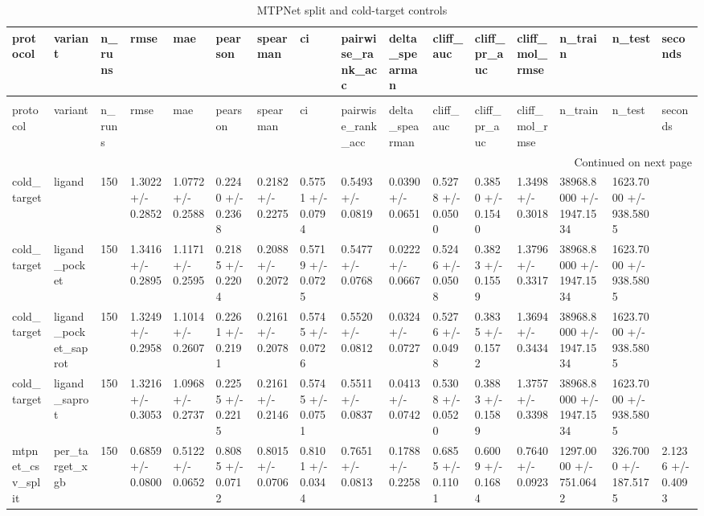 \begin{longtable}{llllllllllllllll}
\caption{MTPNet split and cold-target controls} \label{tab:table_09b_mtpnet_controls} \\
\toprule
protocol & variant & n\_runs & rmse & mae & pearson & spearman & ci & pairwise\_rank\_acc & delta\_spearman & cliff\_auc & cliff\_pr\_auc & cliff\_mol\_rmse & n\_train & n\_test & seconds \\
\midrule
\endfirsthead
\caption[]{MTPNet split and cold-target controls} \\
\toprule
protocol & variant & n\_runs & rmse & mae & pearson & spearman & ci & pairwise\_rank\_acc & delta\_spearman & cliff\_auc & cliff\_pr\_auc & cliff\_mol\_rmse & n\_train & n\_test & seconds \\
\midrule
\endhead
\midrule
\multicolumn{16}{r}{Continued on next page} \\
\midrule
\endfoot
\bottomrule
\endlastfoot
cold\_target & ligand & 150 & 1.3022 +/- 0.2852 & 1.0772 +/- 0.2588 & 0.2240 +/- 0.2368 & 0.2182 +/- 0.2275 & 0.5751 +/- 0.0794 & 0.5493 +/- 0.0819 & 0.0390 +/- 0.0651 & 0.5278 +/- 0.0500 & 0.3850 +/- 0.1540 & 1.3498 +/- 0.3018 & 38968.8000 +/- 1947.1534 & 1623.7000 +/- 938.5805 &  \\
cold\_target & ligand\_pocket & 150 & 1.3416 +/- 0.2895 & 1.1171 +/- 0.2595 & 0.2185 +/- 0.2204 & 0.2088 +/- 0.2072 & 0.5719 +/- 0.0725 & 0.5477 +/- 0.0768 & 0.0222 +/- 0.0667 & 0.5246 +/- 0.0508 & 0.3823 +/- 0.1559 & 1.3796 +/- 0.3317 & 38968.8000 +/- 1947.1534 & 1623.7000 +/- 938.5805 &  \\
cold\_target & ligand\_pocket\_saprot & 150 & 1.3249 +/- 0.2958 & 1.1014 +/- 0.2607 & 0.2261 +/- 0.2191 & 0.2161 +/- 0.2078 & 0.5745 +/- 0.0726 & 0.5520 +/- 0.0812 & 0.0324 +/- 0.0727 & 0.5276 +/- 0.0498 & 0.3835 +/- 0.1572 & 1.3694 +/- 0.3434 & 38968.8000 +/- 1947.1534 & 1623.7000 +/- 938.5805 &  \\
cold\_target & ligand\_saprot & 150 & 1.3216 +/- 0.3053 & 1.0968 +/- 0.2737 & 0.2255 +/- 0.2215 & 0.2161 +/- 0.2146 & 0.5745 +/- 0.0751 & 0.5511 +/- 0.0837 & 0.0413 +/- 0.0742 & 0.5308 +/- 0.0520 & 0.3883 +/- 0.1589 & 1.3757 +/- 0.3398 & 38968.8000 +/- 1947.1534 & 1623.7000 +/- 938.5805 &  \\
mtpnet\_csv\_split & per\_target\_xgb & 150 & 0.6859 +/- 0.0800 & 0.5122 +/- 0.0652 & 0.8085 +/- 0.0712 & 0.8015 +/- 0.0706 & 0.8101 +/- 0.0344 & 0.7651 +/- 0.0813 & 0.1788 +/- 0.2258 & 0.6855 +/- 0.1101 & 0.6009 +/- 0.1684 & 0.7640 +/- 0.0923 & 1297.0000 +/- 751.0642 & 326.7000 +/- 187.5175 & 2.1236 +/- 0.4093 \\

\end{longtable}
